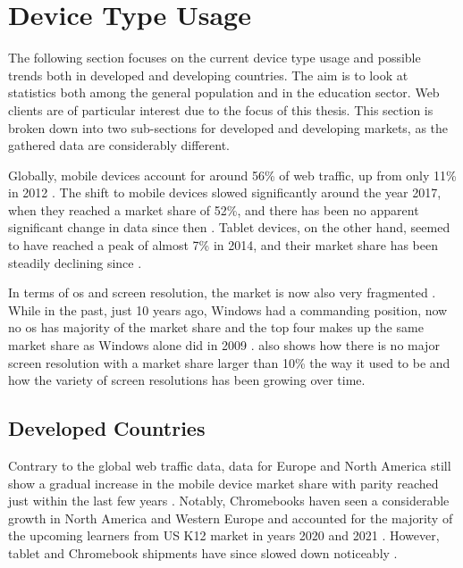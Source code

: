 \section{Device Type Usage}

The following section focuses on the current device type usage and possible trends both in developed and developing countries.
The aim is to look at statistics both among the general population and in the education sector.
Web clients are of particular interest due to the focus of this thesis.
This section is broken down into two sub-sections for developed and developing markets, as the gathered data are considerably different.

Globally, mobile devices account for around 56\% of web traffic, up from only 11\% in 2012 \parencite{StatCounter_2023}.
The shift to mobile devices slowed significantly around the year 2017, when they reached a market share of 52\%, and there has been no apparent significant change in data since then \parencite{StatCounter_2023}.
Tablet devices, on the other hand, seemed to have reached a peak of almost 7\% in 2014, and their market share has been steadily declining since \parencite{StatCounter_2023}.

In terms of \gls{os} and screen resolution, the market is now also very fragmented \parencites{StatCounter_OS_2023}{StatCounter_Resolution_2023}.
While in the past, just 10 years ago, Windows had a commanding position, now no \gls{os} has majority of the market share and the top four makes up the same market share as Windows alone did in 2009 \parencite{StatCounter_OS_2023}.
\textcite{StatCounter_Resolution_2023} also shows how there is no major screen resolution with a market share larger than 10\% the way it used to be and how the variety of screen resolutions has been growing over time.

\subsection{Developed Countries}

Contrary to the global web traffic data, data for Europe and North America still show a gradual increase in the mobile device market share with parity reached just within the last few years \parencites{StatCounter_Europe_2023}{StatCounter_NorthAmerica_2023}.
Notably, Chromebooks haven seen a considerable growth in North America and Western Europe and accounted for the majority of the upcoming learners from US K12 market in years 2020 and 2021 \parencite{Boreham_2019, IDC_2021}.
However, tablet and Chromebook shipments have since slowed down noticeably \parencite{IDC_2022}.

